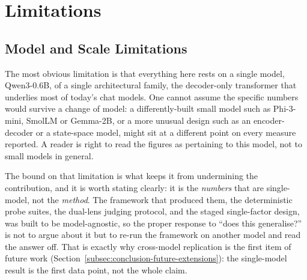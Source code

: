 %
%
\section{Limitations}
\label{sec:limitations}

\subsection{Model and Scale Limitations}
\label{subsec:model-scale-limitations}

The most obvious limitation is that everything here rests on a single model, Qwen3-0.6B, of a single architectural family, the decoder-only transformer that underlies most of today's chat models. One cannot assume the specific numbers would survive a change of model: a differently-built small model such as Phi-3-mini, SmolLM or Gemma-2B, or a more unusual design such as an encoder-decoder or a state-space model, might sit at a different point on every measure reported. A reader is right to read the figures as pertaining to this model, not to small models in general.

The bound on that limitation is what keeps it from undermining the contribution, and it is worth stating clearly: it is the \emph{numbers} that are single-model, not the \emph{method}. The framework that produced them, the deterministic probe suites, the dual-lens judging protocol, and the staged single-factor design, was built to be model-agnostic, so the proper response to ``does this generalise?'' is not to argue about it but to re-run the framework on another model and read the answer off. That is exactly why cross-model replication is the first item of future work (Section~\ref{subsec:conclusion-future-extensions}): the single-model result is the first data point, not the whole claim.

